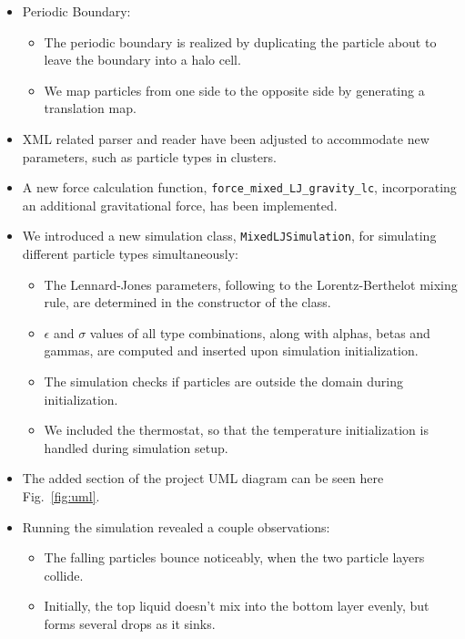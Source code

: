 \documentclass{article}
\begin{document}
    \begin{itemize}
        \item Periodic Boundary:
        \begin{itemize}
            \item The periodic boundary is realized by duplicating the particle about to leave the boundary into a halo cell.
            \item We map particles from one side to the opposite side by generating a translation map.
        \end{itemize}
        \item XML related parser and reader have been adjusted to accommodate new parameters, such as particle types in clusters.
        \item A new force calculation function, \texttt{force\_mixed\_LJ\_gravity\_lc}, incorporating an additional gravitational force, has been implemented.
        \item We introduced a new simulation class, \texttt{MixedLJSimulation}, for simulating different particle types simultaneously:
        \begin{itemize}
            \item The Lennard-Jones parameters, following to the Lorentz-Berthelot mixing rule, are determined in the constructor of the class.
            \item $\epsilon$ and $\sigma$ values of all type combinations, along with alphas, betas and gammas, are computed and inserted upon simulation initialization.
            \item The simulation checks if particles are outside the domain during initialization.
            \item We included the thermostat, so that the temperature initialization is handled during simulation setup.
        \end{itemize}
        \item The added section of the project UML diagram can be seen here Fig.\ \ref{fig:uml}.
        \item Running the simulation revealed a couple observations:
        \begin{itemize}
            \item The falling particles bounce noticeably, when the two particle layers collide.
            \item Initially, the top liquid doesn't mix into the bottom layer evenly, but forms several drops as it sinks.
        \end{itemize}
    \end{itemize}
\end{document}
